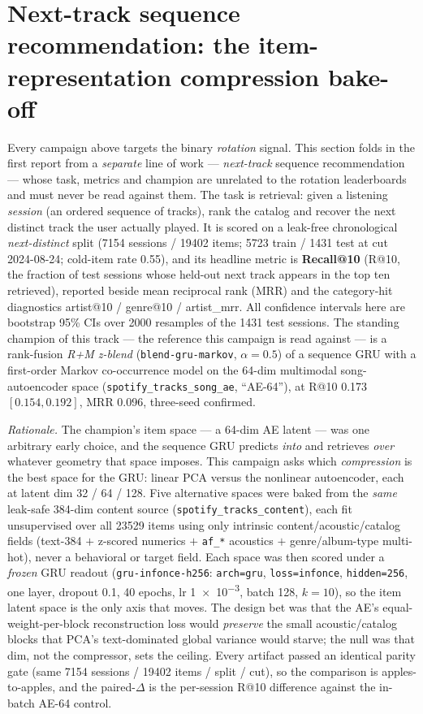 \documentclass[11pt]{article}
\begin{document}
\section{Next-track sequence recommendation: the item-representation compression bake-off}
\label{sec:nexttrack-compression}
Every campaign above targets the binary \emph{rotation} signal. This section
folds in the first report from a \emph{separate} line of work --- \emph{next-track}
sequence recommendation --- whose task, metrics and champion are unrelated to the
rotation leaderboards and must never be read against them. The task is
retrieval: given a listening \emph{session} (an ordered sequence of tracks),
rank the catalog and recover the next distinct track the user actually played.
It is scored on a leak-free chronological \emph{next-distinct} split (\num{7154}
sessions / \num{19402} items; \num{5723} train / \num{1431} test at cut
2024-08-24; cold-item rate 0.55), and its headline metric is \textbf{Recall@10}
(R@10, the fraction of test sessions whose held-out next track appears in the
top ten retrieved), reported beside mean reciprocal rank (MRR) and the
category-hit diagnostics artist@10 / genre@10 / artist\_mrr. All confidence
intervals here are bootstrap 95\% CIs over \num{2000} resamples of the
\num{1431} test sessions. The standing champion of this track --- the reference
this campaign is read against --- is a rank-fusion \emph{R+M z-blend}
(\texttt{blend-gru-markov}, $\alpha{=}0.5$) of a sequence GRU with a first-order
Markov co-occurrence model on the 64-dim multimodal song-autoencoder space
(\texttt{spotify\_tracks\_song\_ae}, ``AE-64''), at R@10 \num{0.173}
$[0.154, 0.192]$, MRR \num{0.096}, three-seed confirmed.

\emph{Rationale.} The champion's item space --- a 64-dim AE latent --- was one
arbitrary early choice, and the sequence GRU predicts \emph{into} and retrieves
\emph{over} whatever geometry that space imposes. This campaign asks which
\emph{compression} is the best space for the GRU: linear PCA versus the
nonlinear autoencoder, each at latent dim 32 / 64 / 128. Five alternative spaces
were baked from the \emph{same} leak-safe 384-dim content source
(\texttt{spotify\_tracks\_content}), each fit unsupervised over all \num{23529}
items using only intrinsic content/acoustic/catalog fields (text-384 $+$
z-scored numerics $+$ \texttt{af\_*} acoustics $+$ genre/album-type multi-hot),
never a behavioral or target field. Each space was then scored under a
\emph{frozen} GRU readout (\texttt{gru-infonce-h256}: \texttt{arch=gru},
\texttt{loss=infonce}, \texttt{hidden=256}, one layer, dropout 0.1, 40 epochs,
lr \num{1e-3}, batch 128, $k{=}10$), so the item latent space is the only axis
that moves. The design bet was that the AE's equal-weight-per-block
reconstruction loss would \emph{preserve} the small acoustic/catalog blocks that
PCA's text-dominated global variance would starve; the null was that dim, not
the compressor, sets the ceiling. Every artifact passed an identical parity gate
(same \num{7154} sessions / \num{19402} items / split / cut), so the comparison
is apples-to-apples, and the paired-$\Delta$ is the per-session R@10 difference
against the in-batch AE-64 control.
\end{document}
